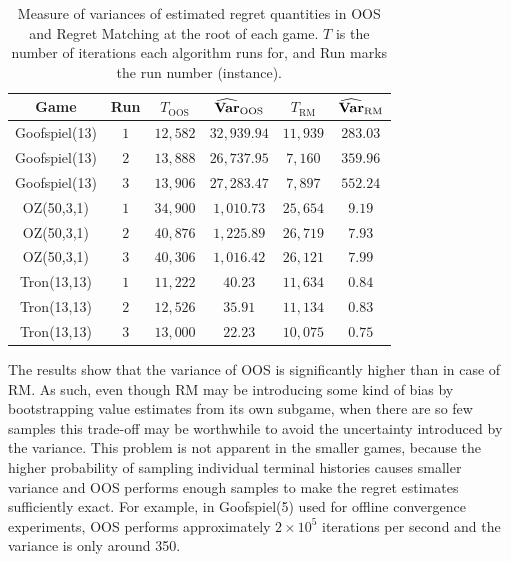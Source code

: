 {\begin{table}
\centering
\begin{footnotesize}
\begin{tabular}{|c||c|c|c|c|c|}
\hline
Game & Run & $T_{\text{OOS}}$ & $\widehat{\mathbf{Var}}_{\text{OOS}}$ & $T_{\text{RM}}$ & $\widehat{\mathbf{Var}}_{\text{RM}}$ \\
\hline
Goofspiel(13)	& $1$	& $12,582$	& $32,939.94$	& $11,939$	& $283.03$ \\
Goofspiel(13)	& $2$	& $13,888$	& $26,737.95$	& $7,160$	& $359.96$ \\
Goofspiel(13)	& $3$	& $13,906$	& $27,283.47$	& $7,897$	& $552.24$ \\
\hline
OZ(50,3,1) &	$1$ &	$34,900$	& $1,010.73$ & $25,654$	& $9.19$ \\
OZ(50,3,1) &	$2$	& $40,876$	& $1,225.89$ & $26,719$	& $7.93$ \\
OZ(50,3,1) &	$3$	& $40,306$	& $1,016.42$ & $26,121$	& $7.99$ \\
\hline
Tron(13,13) & $1$	& $11,222$	& $40.23$ & $11,634$ &	$0.84$ \\
Tron(13,13)	& $2$	& $12,526$	& $35.91$ & $11,134$	& $0.83$ \\
Tron(13,13)	& $3$	& $13,000$	& $22.23$ & $10,075$ & $0.75$ \\
\hline
\end{tabular}
\end{footnotesize}
\caption{Measure of variances of estimated regret quantities in OOS and Regret Matching at the root of each game.
$T$ is the number of iterations each algorithm runs for, and Run marks the run number (instance). \label{tab:oos_vs_rm}}
\end{table}

The results show that the variance of OOS is significantly higher than in case of RM. As such, even though RM may be introducing
some kind of bias by bootstrapping value estimates from its own subgame, when there are so few samples this trade-off may be worthwhile
to avoid the uncertainty introduced by the variance. This problem is not apparent in the smaller games, because the higher probability of sampling individual terminal histories causes smaller variance and OOS performs enough samples  to make the regret estimates sufficiently exact. For example, in Goofspiel(5) used for offline convergence experiments, OOS performs approximately $2 \times 10^5$ iterations per second and the variance is only around 350. 



}


